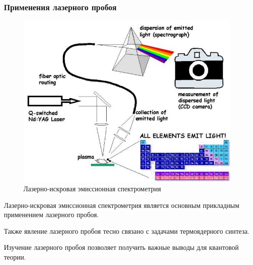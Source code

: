 \documentclass{beamer}
\begin{document}
	\begin{frame}
		\frametitle{Применения лазерного пробоя}
	
		\begin{figure}
			\centering
			\captionsetup{justification=centering}
			\includegraphics[width=0.5\linewidth]{res/libs.jpg}
			\caption*{Лазерно-искровая эмиссионная спектрометрия}
		\end{figure}
			
		Лазерно-искровая эмиссионная спектрометрия является основным прикладным применением лазерного пробоя.
		
		Также явление лазерного пробоя тесно связано с задачами термоядерного синтеза.
		
		Изучение лазерного пробоя позволяет получить важные выводы для квантовой теории.
		
	\end{frame}
	
\end{document}
